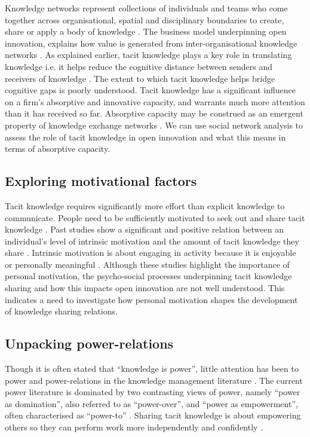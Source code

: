 Knowledge networks represent collections of individuals and teams who come together across organisational, spatial and disciplinary boundaries to create, share or apply a body of knowledge \citep{pugh2013designing}. The business model underpinning open innovation, explains how value is generated from inter-organisational knowledge networks \citep{chiaroni2010unravelling}. As explained earlier, tacit knowledge plays a key role in translating knowledge i.e. it helps reduce the cognitive distance between senders and receivers of knowledge \citep{seidler2008use}. The extent to which tacit knowledge helps bridge cognitive gaps is poorly understood. Tacit knowledge has a significant influence on a firm's absorptive and innovative capacity, and warrants much more attention than it has received so far. Absorptive capacity may be construed as an emergent property of knowledge exchange networks \citep{tortoriello2015social}. We can use social network analysis to assess the role of tacit knowledge in open innovation and what this means in terms of absorptive capacity. \medskip

\subsection{Exploring motivational factors}

Tacit knowledge requires significantly more effort than explicit knowledge to communicate. People need to be sufficiently motivated to seek out and share tacit knowledge \citep{leonard1998role}. Past studies show a significant and positive relation between an individual's level of intrinsic motivation and the amount of tacit knowledge they share  \citep[e.g.][]{osterloh2000motivation,kaser2001knowledge,smith2001role}. Intrinsic motivation is about engaging in activity because it is enjoyable or personally meaningful \citep{ryan2000intrinsic}. Although these studies highlight the importance of personal motivation, the psycho-social processes underpinning tacit knowledge sharing and how this impacts open innovation are not well understood. This indicates a need to investigate how personal motivation shapes the development of knowledge sharing relations. \medskip

\subsection{Unpacking power-relations} 

Though it is often stated that \enquote{knowledge is power}, little attention has been  to power and power-relations in the knowledge management literature \citep{heizmann2015power}. The current power literature is dominated by two contrasting views of power, namely \enquote{power as domination}, also referred to as \enquote{power-over}, and \enquote{power as empowerment}, often characterised as \enquote{power-to} \citep{haugaard2012rethinking}. Sharing tacit knowledge is about empowering others so they can perform work more independently and confidently \citep{bordum2002tacit,lin2007share}. \medskip

